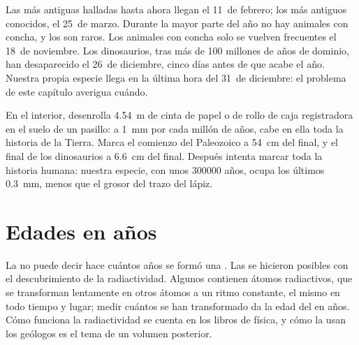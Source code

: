 Las  más antiguas halladas hasta ahora llegan el 11~de febrero; los
 más antiguos conocidos, el 25~de marzo. Durante la mayor parte del
año no hay animales con concha, y los  son raros. Los animales con
concha solo se vuelven frecuentes el 18~de noviembre. Los dinosaurios,
tras más de \num{100} millones de años de dominio, han desaparecido el
26~de diciembre, cinco días antes de que acabe el año. Nuestra propia
especie llega en la última hora del 31~de diciembre: el problema de este
capítulo averigua cuándo.

\begin{inthelab}
En el interior, desenrolla \qty{4.54}{m} de cinta de papel o de rollo de
caja registradora en el suelo de un pasillo: a \qty{1}{mm} por cada millón
de años, cabe en ella toda la historia de la Tierra. Marca el comienzo del
Paleozoico a \qty{54}{cm} del final, y el final de los dinosaurios a
\qty{6.6}{cm} del final. Después intenta marcar toda la historia humana:
nuestra especie, con unos \num{300000} años, ocupa los últimos
\qty{0.3}{mm}, menos que el grosor del trazo del lápiz.
\end{inthelab}

\section{Edades en años}

La  no puede decir hace cuántos años se formó una .
Las  se hicieron posibles con el descubrimiento de la
radiactividad. Algunos  contienen átomos radiactivos, que se
transforman lentamente en otros átomos a un ritmo constante, el mismo en
todo tiempo y lugar; medir cuántos se han transformado da la edad del
 en años. Cómo funciona la radiactividad se cuenta en los libros de
física, y cómo la usan los geólogos es el tema de un volumen posterior.

